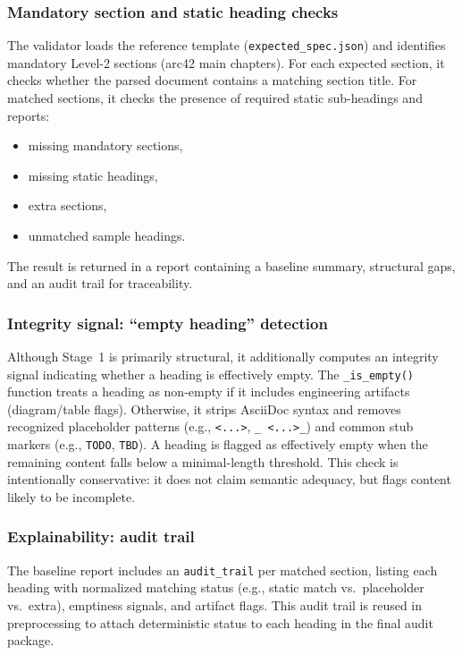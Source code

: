 \subsubsection{Mandatory section and static heading checks}
The validator loads the reference template (\texttt{expected\_spec.json}) and identifies mandatory Level-2 sections (arc42 main chapters). For each expected section, it checks whether the parsed document contains a matching section title. For matched sections, it checks the presence of required static sub-headings and reports:
\begin{itemize}
    \item missing mandatory sections,
    \item missing static headings,
    \item extra sections,
    \item unmatched sample headings.
\end{itemize}
The result is returned in a report containing a baseline summary, structural gaps, and an audit trail for traceability.

\subsubsection{Integrity signal: ``empty heading'' detection}
Although Stage~1 is primarily structural, it additionally computes an integrity signal indicating whether a heading is effectively empty. The \texttt{\_is\_empty()} function treats a heading as non-empty if it includes engineering artifacts (diagram/table flags). Otherwise, it strips AsciiDoc syntax and removes recognized placeholder patterns (e.g., \texttt{\textless ...\textgreater}, \texttt{\_ \textless ...\textgreater \_}) and common stub markers (e.g., \texttt{TODO}, \texttt{TBD}). A heading is flagged as effectively empty when the remaining content falls below a minimal-length threshold. This check is intentionally conservative: it does not claim semantic adequacy, but flags content likely to be incomplete.

\subsubsection{Explainability: audit trail}
The baseline report includes an \texttt{audit\_trail} per matched section, listing each heading with normalized matching status (e.g., static match vs.\ placeholder vs.\ extra), emptiness signals, and artifact flags. This audit trail is reused in preprocessing to attach deterministic status to each heading in the final audit package.

